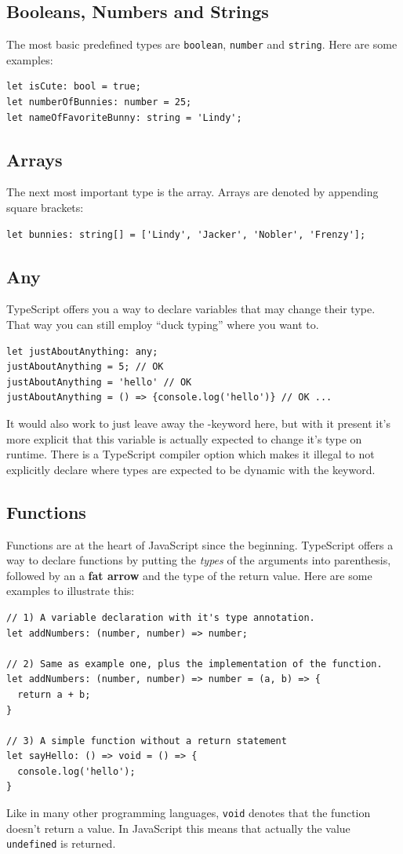 \documentclass[12pt,a4paper]{report}
\newcommand{\code}[1]{\fbox{\texttt{#1}}}
\begin{document}
\subsection{Booleans, Numbers and Strings}
The most basic predefined types are \texttt{boolean}, \texttt{number} and \texttt{string}. Here are some examples:
\begin{lstlisting}
let isCute: bool = true;
let numberOfBunnies: number = 25;
let nameOfFavoriteBunny: string = 'Lindy';
\end{lstlisting}

\subsection{Arrays}
The next most important type is the array. Arrays are denoted by appending square brackets:
\begin{lstlisting}
let bunnies: string[] = ['Lindy', 'Jacker', 'Nobler', 'Frenzy'];
\end{lstlisting}

\subsection{Any}
TypeScript offers you a way to declare variables that may change their type. That way you can still employ ``duck typing'' where you want to.
\begin{lstlisting}
let justAboutAnything: any;
justAboutAnything = 5; // OK
justAboutAnything = 'hello' // OK
justAboutAnything = () => {console.log('hello')} // OK ...
\end{lstlisting}
It would also work to just leave away the \code{any}-keyword here, but with it present it's more explicit that this variable is actually expected to change it's type on runtime. There is a TypeScript compiler option \code{noImplicitAny} which makes it illegal to not explicitly declare where types are expected to be dynamic with the \code{any} keyword.


\subsection{Functions}
Functions are at the heart of JavaScript since the beginning. TypeScript offers a way to declare functions by putting the \textit{types} of the arguments into parenthesis, followed by an a \textbf{fat arrow} \code{=>} and the type of the return value. Here are some examples to illustrate this:
\begin{lstlisting}
// 1) A variable declaration with it's type annotation.
let addNumbers: (number, number) => number;

// 2) Same as example one, plus the implementation of the function.
let addNumbers: (number, number) => number = (a, b) => {
  return a + b;
}

// 3) A simple function without a return statement
let sayHello: () => void = () => {
  console.log('hello');
}
\end{lstlisting}
Like in many other programming languages, \texttt{void} denotes that the function doesn't return a value. In JavaScript this means that actually the value \texttt{undefined} is returned.
\end{document}
